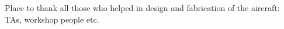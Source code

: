 \acknowledgements %

\indent
Place to thank all those who helped in design and fabrication of the aircraft: TAs, workshop people etc.
